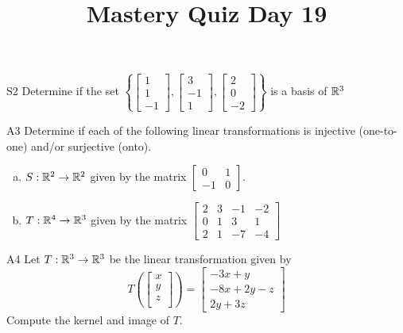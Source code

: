 \documentclass{sbgLAquiz}
\title{Mastery Quiz Day 19 }
\begin{document}
\begin{problem}{S2}
Determine if the set $\left\{\begin{bmatrix} 1 \\ 1 \\ -1 \end{bmatrix}, \begin{bmatrix} 3 \\ -1 \\ 1 \end{bmatrix},\begin{bmatrix} 2 \\ 0 \\ -2 \end{bmatrix}\right\}$ is a basis of $\mathbb{R}^3$
\end{problem}

\begin{problem}{A3}
Determine if each of the following linear transformations is injective (one-to-one) and/or surjective (onto).
\begin{enumerate}[(a)]
\item $S: \mathbb{R}^2 \rightarrow \mathbb{R}^2$ given by the matrix $\begin{bmatrix} 0 & 1 \\ -1 & 0 \end{bmatrix}$.
\item $T: \mathbb{R}^4 \rightarrow \mathbb{R}^3$ given by the matrix $\begin{bmatrix} 2 & 3 & -1 & -2 \\ 0 & 1 & 3 & 1 \\ 2 & 1 & -7 & -4 \end{bmatrix}$
\end{enumerate}
\end{problem}
\newpage

\begin{problem}{A4}
Let $T: \mathbb{R}^3\rightarrow \mathbb{R}^3$ be the linear transformation given by $$T\left(\begin{bmatrix} x \\ y \\ z \\  \end{bmatrix} \right) = \begin{bmatrix} -3x+y \\ -8x+2y-z \\ 2y+3z \end{bmatrix}$$
Compute the kernel and image of $T$.
\end{problem}
\end{document}
